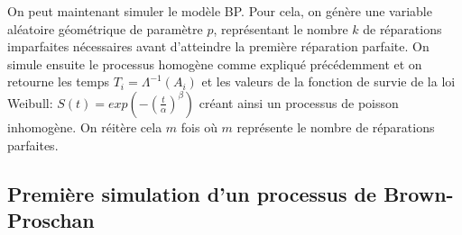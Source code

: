 \documentclass[
]{article}
\begin{document}
On peut maintenant simuler le modèle BP. Pour cela, on génère une
variable aléatoire géométrique de paramètre \(p\), représentant le
nombre \(k\) de réparations imparfaites nécessaires avant d'atteindre la
première réparation parfaite. On simule ensuite le processus homogène
comme expliqué précédemment et on retourne les temps
\(T_i = \Lambda^{-1}(A_i)\) et les valeurs de la fonction de survie de
la loi Weibull: \(S(t)=exp{(-(\frac{t}{\alpha})^{\beta})}\) créant ainsi
un processus de poisson inhomogène. On réitère cela \(m\) fois où \(m\)
représente le nombre de réparations parfaites.

\subsection{Première simulation d'un processus de
Brown-Proschan}\label{premiuxe8re-simulation-dun-processus-de-brown-proschan}
\end{document}
